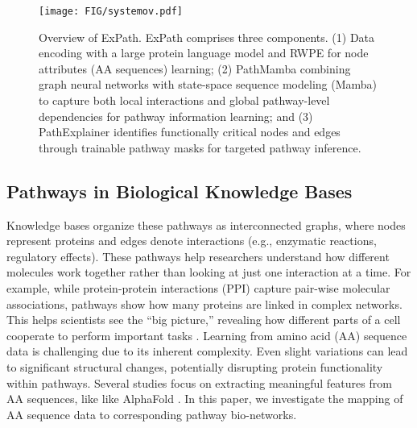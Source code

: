 \begin{figure*}[t]
    \centering
    \texttt{[image: FIG/systemov.pdf]}
    \caption{
    Overview of ExPath. ExPath comprises three components. (1) Data encoding with a large protein language model and RWPE for node attributes (AA sequences) learning; (2) PathMamba combining graph neural networks with state-space sequence modeling (Mamba) to capture both local interactions and global pathway-level dependencies for pathway information learning; and (3) PathExplainer identifies functionally critical nodes and edges through trainable pathway masks for targeted pathway inference.}
    \label{fig:systemOV}
\end{figure*}


\subsection{Pathways in Biological Knowledge Bases}\label{subsec:pathway}
Knowledge bases organize these pathways as interconnected graphs, where nodes represent proteins and edges denote interactions (e.g., enzymatic reactions, regulatory effects). 
These pathways help researchers understand how different molecules work together rather than looking at just one interaction at a time.
For example, while protein-protein interactions (PPI) \cite{PPI} capture pair-wise molecular associations, pathways show how many proteins are linked in complex networks. 
This helps scientists see the “big picture,” revealing how different parts of a cell cooperate to perform important tasks \cite{KEGG2024}.
Learning from amino acid (AA) sequence data is challenging due to its inherent complexity. 
Even slight variations can lead to significant structural changes, potentially disrupting protein functionality within pathways. 
Several studies focus on extracting meaningful features from AA sequences, like like AlphaFold \cite{AlphaFold}.
In this paper, we investigate the mapping of AA sequence data to corresponding pathway bio-networks.





